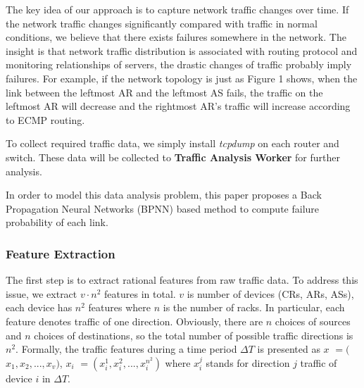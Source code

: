 \documentclass{sig-alternate-05-2015}
\begin{document}
The key idea of our approach is to capture network traffic changes over time. If the network traffic changes significantly compared with traffic in normal conditions, we believe that there exists failures somewhere in the network. The insight is that network traffic distribution is associated with routing protocol and monitoring relationships of servers, the drastic changes of traffic probably imply failures. For example, if the network topology is just as Figure 1 shows, when the link between the leftmost AR and the leftmost AS fails, the traffic on the leftmost AR will decrease and the rightmost AR's traffic will increase according to ECMP routing.

To collect required traffic data, we simply install \textit{tcpdump} on each router and switch. These data will be collected to \textbf{Traffic Analysis Worker} for further analysis.

In order to model this data analysis problem, this paper proposes a Back Propagation Neural Networks (BPNN) based method to compute failure probability of each link.

\subsubsection*{Feature Extraction}
\quad The first step is to extract rational features from raw traffic data. To address this issue, we extract $v \cdot n^2$ features in total. $v$ is number of devices (CRs, ARs, ASs), each device has $n^2$ features where $n$ is the number of racks. In particular, each feature denotes traffic of one direction. Obviously, there are $n$ choices of sources and $n$ choices of destinations, so the total number of possible traffic directions is $n^2$.
Formally, the traffic features during a time period $\Delta T$ is presented as \boldmath $x$
\unboldmath $=($\boldmath $x_1, x_2, ..., x_v$\unboldmath $)$, \boldmath $x_i$
\unboldmath $=(x_i^1, x_i^2, ..., x_i^{n^2})$
where $x_i^j$ stands for direction $j$ traffic of device $i$ in $\Delta T$.
\end{document}
